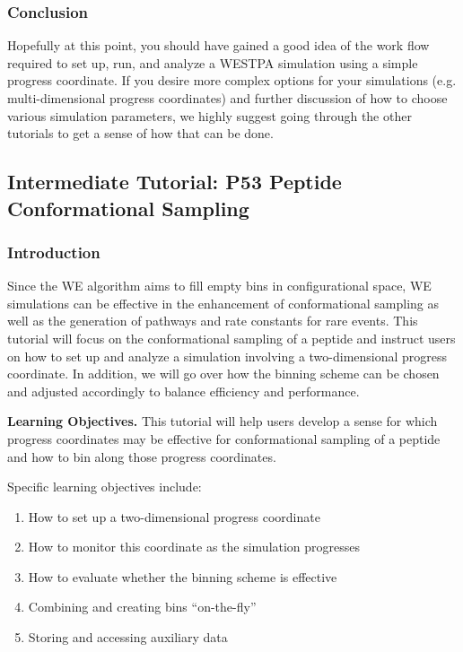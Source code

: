 \documentclass[9pt,tutorial,ASAPversion]{livecoms}
\begin{document}
\subsubsection{Conclusion}

Hopefully at this point, you should have gained a good idea of the work flow required to set up, run, and analyze a WESTPA simulation using a simple progress coordinate. 
If you desire more complex options for your simulations (e.g. multi-dimensional progress coordinates) and further discussion of how to choose various simulation parameters, we highly suggest going through the other tutorials to get a sense of how that can be done.

\subsection{Intermediate Tutorial: P53 Peptide Conformational Sampling}

\subsubsection{Introduction}

Since the WE algorithm aims to fill empty bins in configurational space, WE simulations can be effective in the enhancement of conformational sampling \citep{Dickson2014,Zwier2015} as well as the generation of pathways and rate constants for rare events. 
This tutorial will focus on the conformational sampling of a peptide and instruct users on how to set up and analyze a simulation involving a two-dimensional progress coordinate. 
In addition, we will go over how the binning scheme can be chosen and adjusted accordingly to balance efficiency and performance.

\textbf{Learning Objectives.} This tutorial will help users develop a sense for which progress coordinates may be effective for conformational sampling of a peptide and how to bin along those progress coordinates.  

Specific learning objectives include:
\begin{enumerate}
\item How to set up a two-dimensional progress coordinate
\item How to monitor this coordinate as the simulation progresses
\item How to evaluate whether the binning scheme is effective
\item Combining and creating bins “on-the-fly”
\item Storing and accessing auxiliary data
\end{enumerate}
\end{document}
